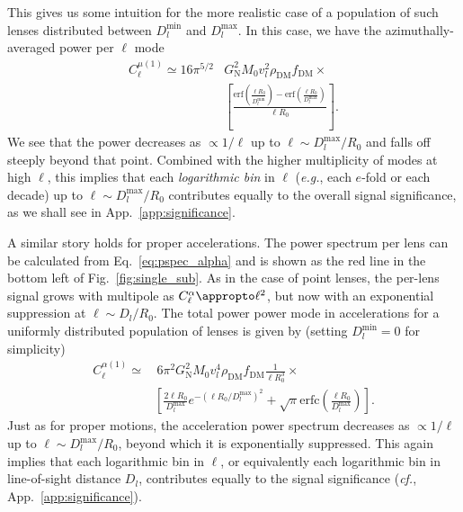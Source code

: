 \documentclass[prd,aps,twocolumn,nofootinbib,superscriptaddress,preprintnumbers,balancelastpage,longbibliography,floatfix]{revtex4-1}
\begin{document}
This gives us some intuition for the more realistic case of a population of such lenses distributed between $D_l^{\mathrm{min}}$ and $D_l^{\mathrm{max}}$. In this case, we have the azimuthally-averaged power per $\ell$ mode 
\begin{align}
C_{\ell}^{\mu (1)} \simeq 16 \pi ^{5/2} &G_\mathrm{N}^2 M_0 v_l^2 \rho_\mathrm{DM} f_\mathrm{DM}\times\nonumber\\ &\left[\frac{{\mathrm{erf}}\left(\frac{\ell
{R_0}}{D_l^{\mathrm{min}}}\right)-{\mathrm{erf}}\left(\frac{\ell {R_0}}{{D_l^{\mathrm{max}}}}\right)}{\ell {R_0}}\right].
\label{eq:mu_extpop}
\end{align}
We see that the power decreases as $\propto 1/\ell$ up to $\ell \sim D_l^\mathrm{max}/R_0$ and falls off steeply beyond that point. Combined with the higher multiplicity of modes at high $\ell$, this implies that each \emph{logarithmic bin} in $\ell$ (\emph{e.g.}, each $e$-fold or each decade) up to $\ell \sim D_{l}^\mathrm{max} / R_0$ contributes equally to the overall signal significance, as we shall see in App.~\ref{app:significance}.

A similar story holds for proper accelerations. The power spectrum per lens can be calculated from Eq.~\eqref{eq:pspec_alpha} and is shown as the red line in the bottom left of Fig.~\ref{fig:single_sub}. As in the case of point lenses, the per-lens signal grows with multipole as $C_\ell^\alpha \appropto \ell^2$, but now with an exponential suppression at $\ell \sim D_l/R_0$. The total power power mode in accelerations for a uniformly distributed population of lenses is given by (setting $D_{l}^{\mathrm{min}} = 0$ for simplicity)
\begin{align}
C_{\ell}^{\alpha (1)} \simeq & \, 6 \pi ^2  G_\mathrm{N}^2  M_0 v_l^4 \rho_\mathrm{DM} f_\mathrm{DM} \frac{1}{\ell R_0^3} \times\nonumber  \\ & \left[\frac{2 \ell R_0}{D_l^{\mathrm{max}}} e^{-({\ell
R_0}/{D_{l}^{\mathrm{max}}})^2}+\sqrt{\pi } \text{erfc}\left(\frac{\ell R_0}{D_{l}^{\mathrm{max}}}\right)\right].
\label{eq:alpha_extpop}
\end{align}
Just as for proper motions, the acceleration power spectrum decreases as $\propto 1/\ell$ up to $\ell \sim D_l^\mathrm{max}/R_0$, beyond which it is exponentially suppressed. This again implies that each logarithmic bin in $\ell$, or equivalently each logarithmic bin in line-of-sight distance $D_l$, contributes equally to the signal significance (\emph{cf.}, App.~\ref{app:significance}).
\end{document}
